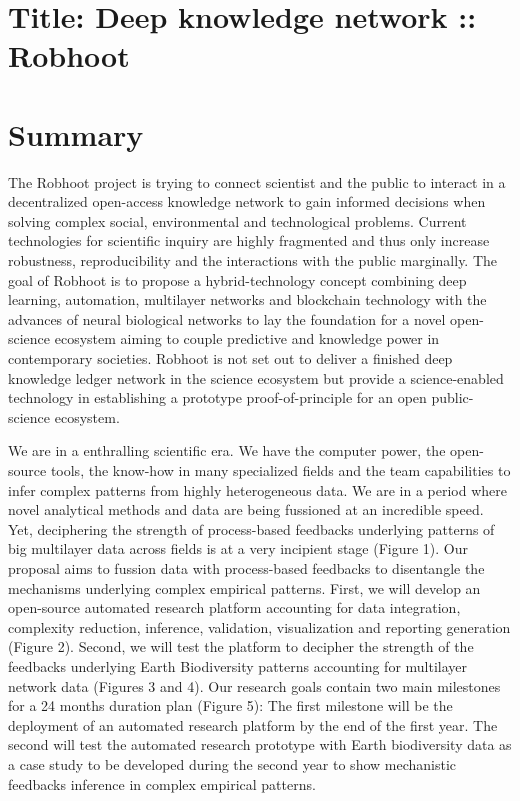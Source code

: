 \documentclass[authoryear,1p,12pt]{elsarticle}
\begin{document}
\section{{\bf Title: Deep knowledge network :: Robhoot}}

\section{{\bf Summary}}
The Robhoot project is trying to connect scientist and the public to
interact in a decentralized open-access knowledge network to gain
informed decisions when solving complex social, environmental and
technological problems. Current technologies for scientific inquiry
are highly fragmented and thus only increase robustness,
reproducibility and the interactions with the public marginally. The
goal of Robhoot is to propose a hybrid-technology concept
combining deep learning, automation, multilayer networks and
blockchain technology with the advances of neural biological networks
to lay the foundation for a novel open-science ecosystem aiming to
couple predictive and knowledge power in contemporary
societies. Robhoot is not set out to deliver a finished deep knowledge
ledger network in the science ecosystem but provide a science-enabled
technology in establishing a prototype proof-of-principle for an open
public-science ecosystem.


We are in a enthralling scientific era. We have the computer power,
the open-source tools, the know-how in many specialized fields and the
team capabilities to infer complex patterns from highly heterogeneous
data. We are in a period where novel analytical methods and data are
being fussioned at an incredible speed. Yet, deciphering the strength
of process-based feedbacks underlying patterns of big multilayer data
across fields is at a very incipient stage (Figure 1). Our proposal
aims to fussion data with process-based feedbacks to disentangle the
mechanisms underlying complex empirical patterns. First, we will
develop an open-source automated research platform accounting for data
integration, complexity reduction, inference, validation,
visualization and reporting generation (Figure 2). Second, we will
test the platform to decipher the strength of the feedbacks underlying
Earth Biodiversity patterns accounting for multilayer network data
(Figures 3 and 4). Our research goals contain two main milestones for
a 24 months duration plan (Figure 5): The first milestone will be the
deployment of an automated research platform by the end of the first
year. The second will test the automated research prototype with Earth
biodiversity data as a case study to be developed during the second
year to show mechanistic feedbacks inference in complex empirical
patterns.
\end{document}

